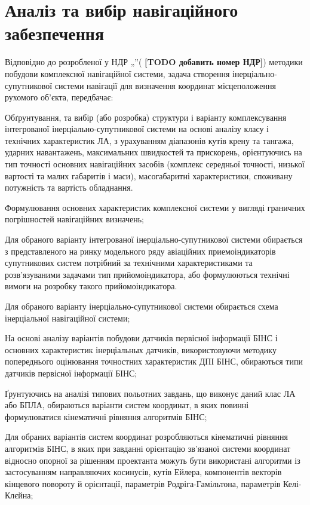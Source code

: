 \section{Аналіз та вибір навігаційного забезпечення}

Відповідно до розробленої у НДР „”( \textbf{[TODO добавить номер НДР]}) методики 
побудови комплексної навігаційної системи, задача створення 
інерціально-супутникової системи навігації для визначення координат 
місцеположення рухомого об'єкта, передбачає:

Обґрунтування, та вибір (або розробка) структури і варіанту комплексування 
інтегрованої інерціально-супутникової системи на основі аналізу класу і 
технічних характеристик ЛА, з урахуванням діапазонів кутів крену та тангажа, 
ударних навантажень, максимальних швидкостей та прискорень, орієнтуючись на 
тип точності основних навігаційних засобів (комплекс середньої точності, 
низької вартості та малих габаритів і маси), масогабаритні характеристики, 
споживану потужність та вартість обладнання. 

Формулювання основних характеристик комплексної системи у вигляді граничних 
погрішностей навігаційних визначень;

Для обраного варіанту інтегрованої інерціально-супутникової системи 
обирається з представленого на ринку модельного ряду авіаційних 
приемоіндикаторів супутникових систем потрібний за технічними 
характеристиками та розв'язуваними задачами тип прийомоіндикатора, або 
формулюються технічні вимоги  на розробку такого прийомоіндикатора. 

Для обраного варіанту інерціально-супутникової системи обирається схема 
інерціальної навігаційної системи;

На основі аналізу варіантів побудови датчиків первісної інформації БІНС
і основних характеристик інерціальных датчиків, використовуючи методику 
попереднього оцінювання точностних характеристик ДПІ 
БІНС, обираються типи датчиків первісної інформації БІНС;

Ґрунтуючись на аналізі типових польотних завдань, що виконує даний клас ЛА
або БПЛА, обираються варіанти систем координат, в яких повинні формулюватися 
кінематичні рівняння алгоритмів БІНС;

Для обраних варіантів систем координат розробляються кінематичні рівняння 
алгоритмів БІНС, в яких при завданні орієнтацію зв'язаної системи координат 
відносно опорної за рішенням проектанта можуть бути використані алгоритми 
із застосуванням направляючих косинусів, кутів Ейлера, компонентів векторів 
кінцевого повороту й орієнтації, параметрів Родріга-Гамільтона, параметрів 
Келі-Клєйна;


